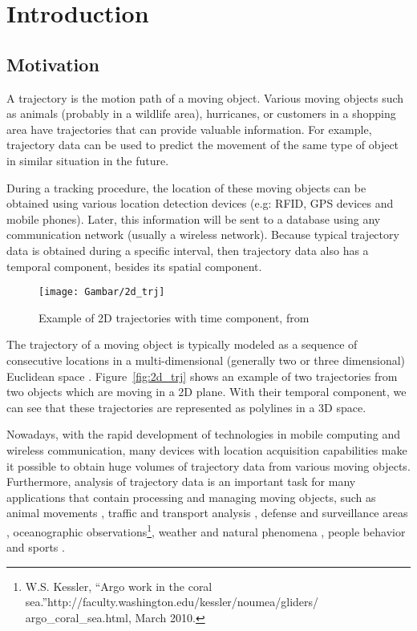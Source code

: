 \chapter{Introduction}

\section{Motivation}

A trajectory is the motion path of a moving object.
Various moving objects such as animals (probably in a wildlife area), hurricanes, or customers in a shopping area have trajectories that can provide valuable information.
For example, trajectory data can be used to predict the movement of the same type of object in similar situation in the future. 

During a tracking procedure, the location of these moving objects can be obtained using various location detection devices (e.g: RFID, GPS devices and mobile phones).
Later, this information will be sent to a database using any communication network (usually a wireless network).
Because typical trajectory data is obtained during a specific interval, then trajectory data also has a temporal component, besides its spatial component.

\begin{figure}
\centering
\texttt{[image: Gambar/2d\_trj]}
\caption[Example of 2D trajectories with time component, from \cite{Vlachos:2002}]{Example of 2D trajectories with time component, from \cite{Vlachos:2002}} 
\end{figure}

The trajectory of a moving object is typically modeled as a sequence of consecutive locations in a multi-dimensional (generally two or three dimensional) Euclidean space \cite{Vlachos:2002}.
Figure~\ref{fig:2d_trj} shows an example of two trajectories from two objects which are moving in a 2D plane.
With their temporal component, we can see that these trajectories are represented as polylines in a 3D space.

Nowadays, with the rapid development of technologies in mobile computing and wireless communication, many devices with location acquisition capabilities make it possible to obtain huge volumes of trajectory data from various moving objects.
Furthermore, analysis of trajectory data is an important task for many applications that contain processing and managing moving objects, such as animal movements \cite{Calenge:2009,Nams:2004,Herb:2010,Brillinger:2001}, traffic and transport analysis \cite{Yunyao:1998}, defense and surveillance areas \cite{Ng:2001}, oceanographic observations\footnote{W.S. Kessler, ``Argo work in the coral sea.''http://faculty.washington.edu/kessler/noumea/gliders/\\argo\_coral\_sea.html, March 2010.}, weather and natural phenomena \cite{Hubert:1957}, people behavior \cite{Fuentes:2001} and sports \cite{Brillinger:2007,Iwase:2002}.

